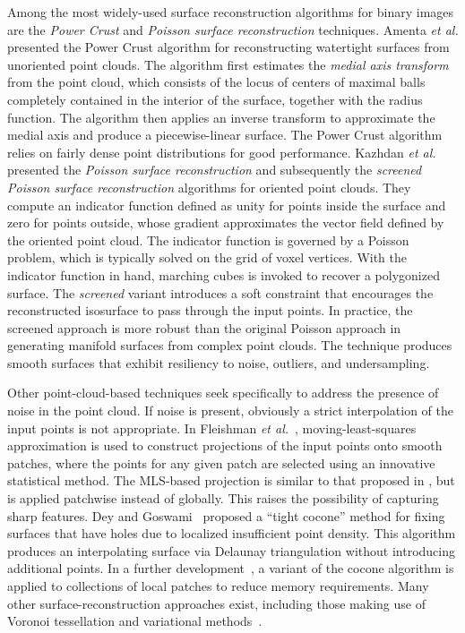 Among the most widely-used surface reconstruction algorithms for binary images are the \textit{Power Crust} and \textit{Poisson surface reconstruction} techniques. Amenta \textit{et al.} \cite{amenta_2001} presented the Power Crust algorithm for reconstructing watertight surfaces from unoriented point clouds. The algorithm first estimates the \textit{medial axis transform} from the point cloud, which consists of the locus of centers of maximal balls completely contained in the interior of the surface, together with the radius function. The algorithm then applies an inverse transform to approximate the medial axis and produce a piecewise-linear surface. The Power Crust algorithm relies on fairly dense point distributions for good performance.  Kazhdan \textit{et al.} presented the \textit{Poisson surface reconstruction} \cite{kazhdan_2008} and subsequently the \textit{screened Poisson surface reconstruction} \cite{kazhdan_2013} algorithms for oriented point clouds. They compute an indicator function defined as unity for points inside the surface and zero for points outside, whose gradient approximates the vector field defined by the oriented point cloud. The indicator function is governed by a Poisson problem, which is typically solved on the grid of voxel vertices.  With the indicator function in hand, marching cubes is invoked to recover a polygonized surface.  The \textit{screened} variant introduces a soft constraint that encourages the reconstructed isosurface to pass through the input points. In practice, the screened approach is more robust than the original Poisson approach in generating manifold surfaces from complex point clouds. The technique produces smooth surfaces that exhibit resiliency to noise, outliers, and undersampling.

Other point-cloud-based techniques seek specifically to address the presence of noise in the point cloud.  If noise is present, obviously a strict interpolation of the input points is not appropriate.  In Fleishman \textit{et al.}~\cite{fleishman2005}, moving-least-squares approximation is used to construct projections of the input points onto smooth patches, where the points for any given patch are selected using an innovative statistical method.  The MLS-based projection is similar to that proposed in \cite{levin2004}, but is applied patchwise instead of globally.  This raises the possibility of capturing sharp features. Dey and Goswami~\cite{dey2003} proposed a ``tight cocone'' method for fixing surfaces that have holes due to localized insufficient point density.  This algorithm produces an interpolating surface via Delaunay triangulation without introducing additional points.  In a further development~\cite{dey2011}, a variant of the cocone algorithm is applied to collections of local patches to reduce memory requirements.  Many other surface-reconstruction approaches exist, including those making use of Voronoi tessellation and variational methods~\cite{berger}.

